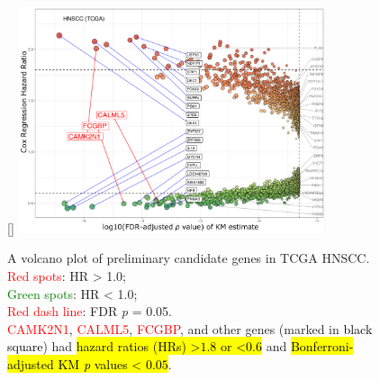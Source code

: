 \documentclass[
paper=landscape,
paper=160mm:90mm, %
fontsize=11pt, %
pagesize, %
parskip=half-, %
]{scrartcl} %
\theoremstyle{mythmstyle} %
\begin{document}

\clearpage

\thispagestyle{headings}

\begin{figure}[ht]

[\FBwidth]
{    \includegraphics[width=9cm]{Rplot_TCGA_HNSCC_CoxHR_CAMK2N1_top3FDRKM.pdf}}
{\captionsetup{labelformat=empty}    
\caption{A volcano plot of preliminary candidate genes in TCGA HNSCC.\\
    \textcolor{red}{Red spots}: HR > 1.0;\\
    \textcolor{green}{Green spots}: HR < 1.0;\\
    \textcolor{red}{Red dash line}: FDR \textit{p} = 0.05.\\
    \textcolor{red}{CAMK2N1}, \textcolor{red}{CALML5}, \textcolor{red}{FCGBP}, and  other genes (marked in \textcolor{black}{black square}) had \hl{hazard ratios (HRs) >$1.8$ or <$0.6$} and \hl{Bonferroni-adjusted KM \textit{p} values < $0.05$}.
    }}
\end{figure}
\end{document}
